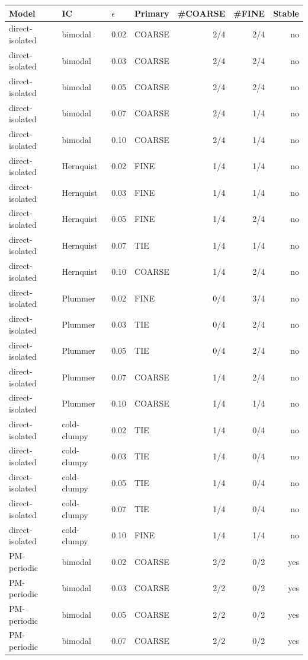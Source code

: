 \begin{tabular}{llllrrr}
\toprule
Model & IC & $\epsilon$ & Primary & \#COARSE & \#FINE & Stable\\
\midrule
direct-isolated & bimodal & 0.02 & COARSE & 2/4 & 2/4 & no\\
direct-isolated & bimodal & 0.03 & COARSE & 2/4 & 2/4 & no\\
direct-isolated & bimodal & 0.05 & COARSE & 2/4 & 2/4 & no\\
direct-isolated & bimodal & 0.07 & COARSE & 2/4 & 1/4 & no\\
direct-isolated & bimodal & 0.10 & COARSE & 2/4 & 1/4 & no\\
direct-isolated & Hernquist & 0.02 & FINE & 1/4 & 1/4 & no\\
direct-isolated & Hernquist & 0.03 & FINE & 1/4 & 1/4 & no\\
direct-isolated & Hernquist & 0.05 & FINE & 1/4 & 2/4 & no\\
direct-isolated & Hernquist & 0.07 & TIE & 1/4 & 1/4 & no\\
direct-isolated & Hernquist & 0.10 & COARSE & 1/4 & 2/4 & no\\
direct-isolated & Plummer & 0.02 & FINE & 0/4 & 3/4 & no\\
direct-isolated & Plummer & 0.03 & TIE & 0/4 & 2/4 & no\\
direct-isolated & Plummer & 0.05 & TIE & 0/4 & 2/4 & no\\
direct-isolated & Plummer & 0.07 & COARSE & 1/4 & 2/4 & no\\
direct-isolated & Plummer & 0.10 & COARSE & 1/4 & 1/4 & no\\
direct-isolated & cold-clumpy & 0.02 & TIE & 1/4 & 0/4 & no\\
direct-isolated & cold-clumpy & 0.03 & TIE & 1/4 & 0/4 & no\\
direct-isolated & cold-clumpy & 0.05 & TIE & 1/4 & 0/4 & no\\
direct-isolated & cold-clumpy & 0.07 & TIE & 1/4 & 0/4 & no\\
direct-isolated & cold-clumpy & 0.10 & FINE & 1/4 & 1/4 & no\\
\midrule
PM-periodic & bimodal & 0.02 & COARSE & 2/2 & 0/2 & yes\\
PM-periodic & bimodal & 0.03 & COARSE & 2/2 & 0/2 & yes\\
PM-periodic & bimodal & 0.05 & COARSE & 2/2 & 0/2 & yes\\
PM-periodic & bimodal & 0.07 & COARSE & 2/2 & 0/2 & yes\\

\end{tabular}
